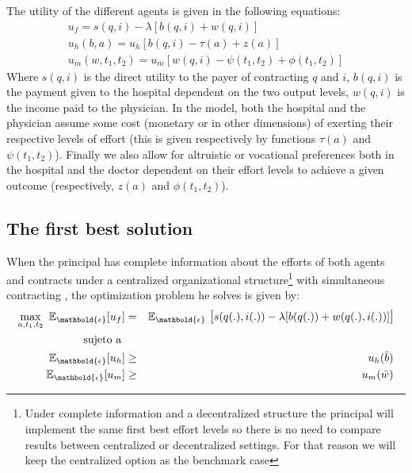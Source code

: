 \documentclass[12pt,letterpaper]{article}
\begin{document}
The utility of the different agents is given in the following equations:
\begin{eqnarray*}\label{util}
    u_f=s(q,i)-\lambda[b(q,i)+w(q,i)]\\
    u_h(b,a)=u_h[b(q,i)-\tau(a)+z(a)]\\
    u_m(w,t_1,t_2)=u_m[w(q,i)-\psi(t_1,t_2)+\phi(t_1,t_2)]
\end{eqnarray*}
Where $s(q,i)$ is the direct utility to the payer of contracting $q$ and $i$, $b(q,i)$ is the payment given to the hospital dependent on the two output levels, $w(q,i)$ is the income paid to the physician. In the model, both the hospital and the physician assume some cost (monetary or in other dimensions) of exerting their respective levels of effort (this is given respectively by functions $\tau(a)$ and $\psi(t_1,t_2)$). Finally we also allow for altruistic or vocational preferences both in the hospital and the doctor dependent on their effort levels to achieve a given outcome (respectively, $z(a)$ and $\phi(t_1,t_2)$).

\subsection{The first best solution}
When the principal has complete information about the efforts of both agents and contracts under a centralized organizational structure\footnote{Under complete information and a decentralized structure the principal will implement the same first best effort levels so there is no need to compare results between centralized or decentralized settings. For that reason we will keep the centralized option as the benchmark case} with simultaneous contracting , the optimization problem he solves is given by:
\begin{eqnarray*}\label{maxf0}
\nonumber    \max\limits_{a,t_1,t_2}\
\mathbb{E}_{\mathbold{\epsilon}}[u_f]&=&\mathbb{E}_{\mathbold{\epsilon}}\text{\large{
[}}s(q(.),i(.))-\lambda[b(q(.))+w(q(
.),i(.))]\text{\large{]}}\\
\nonumber \text{sujeto a }\\
\mathbb{E}_{\mathbold{\epsilon}}[u_h]&\geq& u_h(\bar{b})\\%
\mathbb{E}_{\mathbold{\epsilon}}[u_m]&\geq& u_m(\bar{w})%
\end{eqnarray*}
\end{document}
